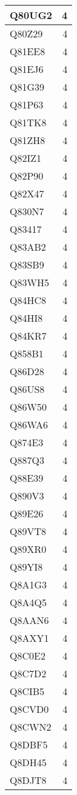 \documentclass[
]{book}
\theoremstyle{definition}
\theoremstyle{definition}
\theoremstyle{definition}
\theoremstyle{definition}
\theoremstyle{remark}
\begin{document}
\begin{table}
\begin{tabular}{l|r}
\hline
Q80UG2 & 4\\
\hline
Q80Z29 & 4\\
\hline
Q81EE8 & 4\\
\hline
Q81EJ6 & 4\\
\hline
Q81G39 & 4\\
\hline
Q81P63 & 4\\
\hline
Q81TK8 & 4\\
\hline
Q81ZH8 & 4\\
\hline
Q82IZ1 & 4\\
\hline
Q82P90 & 4\\
\hline
Q82X47 & 4\\
\hline
Q830N7 & 4\\
\hline
Q83417 & 4\\
\hline
Q83AB2 & 4\\
\hline
Q83SB9 & 4\\
\hline
Q83WH5 & 4\\
\hline
Q84HC8 & 4\\
\hline
Q84HI8 & 4\\
\hline
Q84KR7 & 4\\
\hline
Q858B1 & 4\\
\hline
Q86D28 & 4\\
\hline
Q86US8 & 4\\
\hline
Q86W50 & 4\\
\hline
Q86WA6 & 4\\
\hline
Q874E3 & 4\\
\hline
Q887Q3 & 4\\
\hline
Q88E39 & 4\\
\hline
Q890V3 & 4\\
\hline
Q89E26 & 4\\
\hline
Q89VT8 & 4\\
\hline
Q89XR0 & 4\\
\hline
Q89YI8 & 4\\
\hline
Q8A1G3 & 4\\
\hline
Q8A4Q5 & 4\\
\hline
Q8AAN6 & 4\\
\hline
Q8AXY1 & 4\\
\hline
Q8C0E2 & 4\\
\hline
Q8C7D2 & 4\\
\hline
Q8CIB5 & 4\\
\hline
Q8CVD0 & 4\\
\hline
Q8CWN2 & 4\\
\hline
Q8DBF5 & 4\\
\hline
Q8DH45 & 4\\
\hline
Q8DJT8 & 4\\

\end{tabular}
\end{table}
\end{document}
